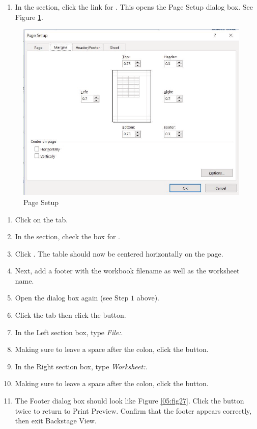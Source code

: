 \begin{enumerate}
	\item In the  section, click the link for . This opens the Page Setup dialog box. See Figure \ref{05:fig26}.
\end{enumerate}

\begin{figure}[H]
	\centering
	\includegraphics[width=\maxwidth{.95\linewidth}]{gfx/ch05_fig26}
	\caption{Page Setup}
	\label{05:fig26}
\end{figure}

\begin{enumerate}[resume]
	\item Click on the  tab.
	\item In the  section, check the box for .
	\item Click . The table should now be centered horizontally on the page.
	\item Next, add a footer with the workbook filename as well as the worksheet name.
	\item Open the  dialog box again (see Step $ 1 $ above).
	\item Click the  tab then click the  button.
	\item In the Left section box, type \textit{File:}.
	\item Making sure to leave a space after the colon, click the  button.
	\item In the Right section box, type \textit{Worksheet:}.
	\item Making sure to leave a space after the colon, click the  button.
	\item The Footer dialog box should look like Figure \ref{05:fig27}. Click the  button twice to return to Print Preview. Confirm that the footer appears correctly, then exit Backstage View.
\end{enumerate}

